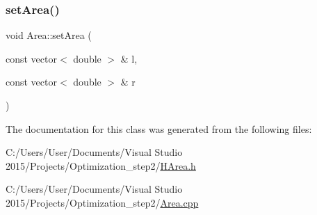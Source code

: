 \mbox{\label{class_area_ad1807b8ed5bb2e91a910b7f822fc5f27}} 
\subsubsection{\texorpdfstring{set\+Area()}{setArea()}}
{\footnotesize\ttfamily void Area\+::set\+Area (\begin{DoxyParamCaption}\item[{const vector$<$ double $>$ \&}]{l,  }\item[{const vector$<$ double $>$ \&}]{r }\end{DoxyParamCaption})}



The documentation for this class was generated from the following files\+:\begin{DoxyCompactItemize}
\item 
C\+:/\+Users/\+User/\+Documents/\+Visual Studio 2015/\+Projects/\+Optimization\+\_\+step2/\hyperlink{_h_area_8h}{H\+Area.\+h}\item 
C\+:/\+Users/\+User/\+Documents/\+Visual Studio 2015/\+Projects/\+Optimization\+\_\+step2/\hyperlink{_area_8cpp}{Area.\+cpp}\end{DoxyCompactItemize}
